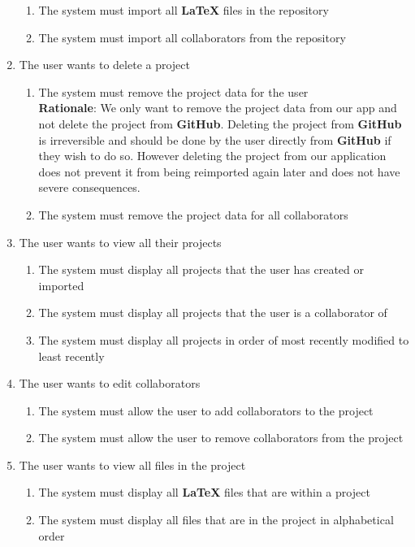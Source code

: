\documentclass[12pt, titlepage]{article}
\begin{document}
\begin{enumerate}[{BE}1.]
\begin{enumerate}[resume*]
			\item The system must import all \textbf{LaTeX} files in the repository
			\item The system must import all collaborators from the repository
		\end{enumerate}
		\item The user wants to delete a project
		\begin{enumerate}[resume*]
			\item The system must remove the project data for the user \\
			\textbf{Rationale}: We only want to remove the project data from our app and not delete the project from \textbf{GitHub}. Deleting the project from \textbf{GitHub} is irreversible and should be done by the user directly from \textbf{GitHub} if they wish to do so. However deleting the project from our application does not prevent it from being reimported again later and does not have severe consequences.
			\item The system must remove the project data for all collaborators
		\end{enumerate}
		\item The user wants to view all their projects
		\begin{enumerate}[resume*]
			\item The system must display all projects that the user has created or imported
			\item The system must display all projects that the user is a collaborator of
			\item The system must display all projects in order of most recently modified to least recently
		\end{enumerate}
		\item The user wants to edit collaborators
		\begin{enumerate}[resume*]
			\item The system must allow the user to add collaborators to the project
			\item The system must allow the user to remove collaborators from the project
		\end{enumerate}
		\item The user wants to view all files in the project
		\begin{enumerate}[resume*]
			\item The system must display all \textbf{LaTeX} files that are within a project
			\item The system must display all files that are in the project in alphabetical order

\end{enumerate}
\end{enumerate}
\end{document}
